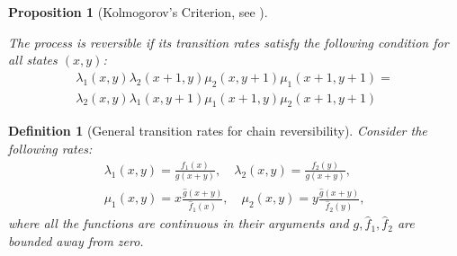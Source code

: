 \documentclass{article}
\newtheorem{definition}{Definition}
\newtheorem{proposition}{Proposition}
\theoremstyle{remark}
\newtheorem*{partial proof}{Partial proof of the Conjecture}
\begin{document}
\begin{proposition}[Kolmogorov's Criterion, see \cite{grimmett2020probability}]
\label{prop:kolmogorov}

The process is reversible if its transition rates satisfy the following condition for all states $(x, y)$:
\begin{equation}
\begin{gathered}
\lambda_{1}(x,y)\lambda_{2}(x+1,y)\mu_{2}(x,y+1)\mu_{1}(x+1,y+1)=\\
\lambda_{2}(x,y)\lambda_{1}(x,y+1)\mu_{1}(x+1,y)\mu_{2}(x+1,y+1)
\end{gathered}
\label{eq:kolmogorov}
\end{equation}
\end{proposition}

\begin{definition}[General transition rates for chain reversibility]
\label{def:rates}
Consider the following rates:
\begin{equation*}
\begin{gathered}
\lambda_{1}(x,y) =\frac{f_1(x)}{g(x+y)} , \quad
\lambda_{2}(x,y) =\frac{f_2(y)}{g(x+y)} ,\\
\mu_{1}(x,y) =x\frac{\hat{g}(x+y)}{\hat{f}_{1}(x)}, \quad
\mu_{2}(x,y) =y\frac{\hat{g}(x+y)}{\hat{f}_{2}(y)} ,
\end{gathered}
\end{equation*}
where all the functions are continuous in their arguments and $g, \hat{f}_1, \hat{f}_2$ are bounded away from zero.
\end{definition}
\end{document}
